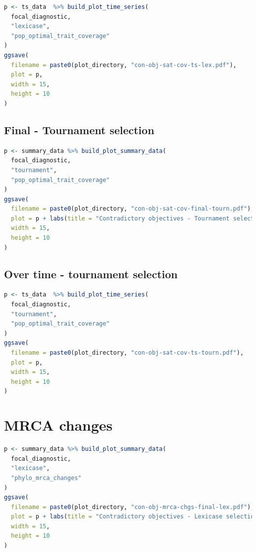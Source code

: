 \documentclass[
]{book}
\begin{document}
\begin{lstlisting}[language=R]
p <- ts_data  %>% build_plot_time_series(
  focal_diagnostic,
  "lexicase",
  "pop_optimal_trait_coverage"
)
ggsave(
  filename = paste0(plot_directory, "con-obj-sat-cov-ts-lex.pdf"),
  plot = p,
  width = 15,
  height = 10
)
\end{lstlisting}

\hypertarget{final---tournament-selection-1}{%
\subsection{Final - Tournament selection}\label{final---tournament-selection-1}}

\begin{lstlisting}[language=R]
p <- summary_data %>% build_plot_summary_data(
  focal_diagnostic,
  "tournament",
  "pop_optimal_trait_coverage"
)
ggsave(
  filename = paste0(plot_directory, "con-obj-sat-cov-final-tourn.pdf"),
  plot = p + labs(title = "Contradictory objectives - Tournament selection"),
  width = 15,
  height = 10
)
\end{lstlisting}

\hypertarget{over-time---tournament-selection}{%
\subsection{Over time - tournament selection}\label{over-time---tournament-selection}}

\begin{lstlisting}[language=R]
p <- ts_data  %>% build_plot_time_series(
  focal_diagnostic,
  "tournament",
  "pop_optimal_trait_coverage"
)
ggsave(
  filename = paste0(plot_directory, "con-obj-sat-cov-ts-tourn.pdf"),
  plot = p,
  width = 15,
  height = 10
)
\end{lstlisting}

\hypertarget{mrca-changes}{%
\section{MRCA changes}\label{mrca-changes}}

\begin{lstlisting}[language=R]
p <- summary_data %>% build_plot_summary_data(
  focal_diagnostic,
  "lexicase",
  "phylo_mrca_changes"
)
ggsave(
  filename = paste0(plot_directory, "con-obj-mrca-chgs-final-lex.pdf"),
  plot = p + labs(title = "Contradictory objectives - Lexicase selection"),
  width = 15,
  height = 10
)
\end{lstlisting}
\end{document}
